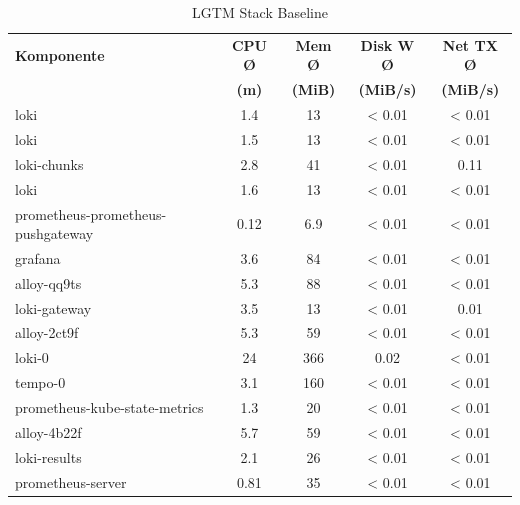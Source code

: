 \begin{table}[h!]
  \begin{center}
    \begin{tabular}{l|S|S|S|S}
      \textbf{Komponente} & \textbf{CPU Ø} & \textbf{Mem Ø} & \textbf{Disk W Ø} & \textbf{Net TX Ø}\\
      & \textbf{(m)} & \textbf{(MiB)} & \textbf{(MiB/s)} & \textbf{(MiB/s)}\\
      \hline
      loki & 1.4 & 13 & < 0.01 & < 0.01\\
      loki & 1.5 & 13 & < 0.01 & < 0.01\\
      loki-chunks & 2.8 & 41 & < 0.01 & 0.11\\
      loki & 1.6 & 13 & < 0.01 & < 0.01\\
      prometheus-prometheus-pushgateway & 0.12 & 6.9 & < 0.01 & < 0.01\\
      grafana & 3.6 & 84 & < 0.01 & < 0.01\\
      alloy-qq9ts & 5.3 & 88 & < 0.01 & < 0.01\\
      loki-gateway & 3.5 & 13 & < 0.01 & 0.01\\
      alloy-2ct9f & 5.3 & 59 & < 0.01 & < 0.01\\
      loki-0 & 24 & 366 & 0.02 & < 0.01\\
      tempo-0 & 3.1 & 160 & < 0.01 & < 0.01\\
      prometheus-kube-state-metrics & 1.3 & 20 & < 0.01 & < 0.01\\
      alloy-4b22f & 5.7 & 59 & < 0.01 & < 0.01\\
      loki-results & 2.1 & 26 & < 0.01 & < 0.01\\
      prometheus-server & 0.81 & 35 & < 0.01 & < 0.01\\
    \end{tabular}
  \end{center}
  \caption{LGTM Stack Baseline}
  \label{tab:baseline}
\end{table}